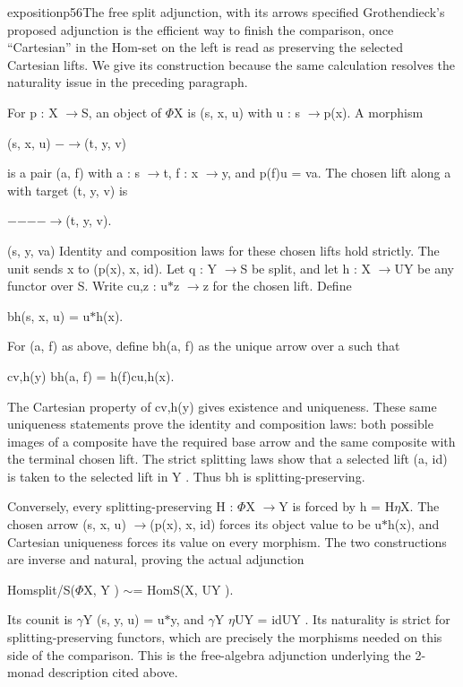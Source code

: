 \begin{dcomment}{exposition}{p56}{The free split adjunction, with its arrows specified}
Grothendieck’s proposed adjunction is the efficient way to finish the comparison, once “Cartesian” in the Hom-set on the left is read as preserving the selected Cartesian lifts. We give its construction because the same calculation resolves the naturality issue in the preceding paragraph.

For p : X \ensuremath{\to}S, an object of \ensuremath{\Phi}X is (s, x, u) with u : s \ensuremath{\to}p(x). A morphism

(s, x, u) \ensuremath{-}\ensuremath{\to}(t, y, v)

is a pair (a, f) with a : s \ensuremath{\to}t, f : x \ensuremath{\to}y, and p(f)u = va. The chosen lift along a with target (t, y, v) is

\ensuremath{-}\ensuremath{-}\ensuremath{-}\ensuremath{-}\ensuremath{\to}(t, y, v).

(s, y, va) Identity and composition laws for these chosen lifts hold strictly. The unit sends x to (p(x), x, id). Let q : Y \ensuremath{\to}S be split, and let h : X \ensuremath{\to}UY be any functor over S. Write cu,z : u\ensuremath{*}z \ensuremath{\to}z for the chosen lift. Define

bh(s, x, u) = u\ensuremath{*}h(x).

For (a, f) as above, define bh(a, f) as the unique arrow over a such that

cv,h(y) bh(a, f) = h(f)cu,h(x).

The Cartesian property of cv,h(y) gives existence and uniqueness. These same uniqueness statements prove the identity and composition laws: both possible images of a composite have the required base arrow and the same composite with the terminal chosen lift. The strict splitting laws show that a selected lift (a, id) is taken to the selected lift in Y . Thus bh is splitting-preserving.

Conversely, every splitting-preserving H : \ensuremath{\Phi}X \ensuremath{\to}Y is forced by h = H\ensuremath{\eta}X. The chosen arrow (s, x, u) \ensuremath{\to}(p(x), x, id) forces its object value to be u\ensuremath{*}h(x), and Cartesian uniqueness forces its value on every morphism. The two constructions are inverse and natural, proving the actual adjunction

Homsplit/S(\ensuremath{\Phi}X, Y ) \ensuremath{\sim}= HomS(X, UY ).

Its counit is \ensuremath{\gamma}Y (s, y, u) = u\ensuremath{*}y, and \ensuremath{\gamma}Y \ensuremath{\eta}UY = idUY . Its naturality is strict for splitting-preserving functors, which are precisely the morphisms needed on this side of the comparison. This is the free-algebra adjunction underlying the 2-monad description cited above.


\end{dcomment}
